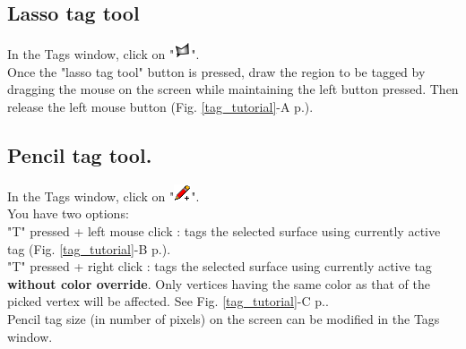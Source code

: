 \documentclass[12pt, a4paper]{book}
\begin{document}
\subsection{Lasso tag tool} \label{lasso_tag_section}
In the Tags window, click on "\includegraphics[scale=0.7]{../images/12/lasso.png}".\\
Once the "lasso tag tool" button is pressed, draw the region to be tagged by dragging the mouse on the screen while maintaining the left button pressed. Then release the left mouse button (Fig. \ref{tag_tutorial}-A p.\pageref{tag_tutorial}). 

\subsection{Pencil tag tool.}
In the Tags window, click on "\includegraphics[scale=0.7]{../images/12/pencil.png}".\\
You have two options:\\
 "T" pressed + left mouse click : tags the selected surface using currently active tag (Fig. \ref{tag_tutorial}-B p.\pageref{tag_tutorial}).\\
"T" pressed + right click : tags the selected surface using currently active tag \textbf{without color override}. Only vertices having the same color as that of the picked vertex will be affected. See Fig. \ref{tag_tutorial}-C p.\pageref{tag_tutorial}.
\\Pencil tag size (in number of pixels) on the screen can be modified in the Tags window.
\end{document}
